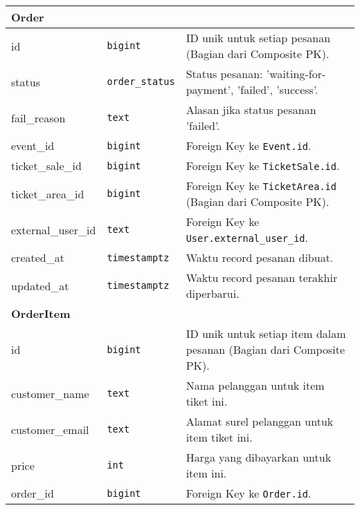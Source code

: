 \begin{longtable}{|l|p{}|p{}|}
	\hline
	\multicolumn{3}{|l|}{\textbf{Order}}                                                                                  \\
	\hline
	id                   & \texttt{bigint}          & ID unik untuk setiap pesanan (Bagian dari Composite PK).            \\
	\hline
	status               & \texttt{order\_status}   & Status pesanan: 'waiting-for-payment', 'failed', 'success'.         \\
	\hline
	fail\_reason         & \texttt{text}            & Alasan jika status pesanan 'failed'.                                \\
	\hline
	event\_id            & \texttt{bigint}          & Foreign Key ke \texttt{Event.id}.                                   \\
	\hline
	ticket\_sale\_id     & \texttt{bigint}          & Foreign Key ke \texttt{TicketSale.id}.                              \\
	\hline
	ticket\_area\_id     & \texttt{bigint}          & Foreign Key ke \texttt{TicketArea.id} (Bagian dari Composite PK).   \\
	\hline
	external\_user\_id   & \texttt{text}            & Foreign Key ke \texttt{User.external\_user\_id}.                    \\
	\hline
	created\_at          & \texttt{timestamptz}     & Waktu record pesanan dibuat.                                        \\
	\hline
	updated\_at          & \texttt{timestamptz}     & Waktu record pesanan terakhir diperbarui.                           \\
	\hline
	\multicolumn{3}{|l|}{\textbf{OrderItem}}                                                                              \\
	\hline
	id                   & \texttt{bigint}          & ID unik untuk setiap item dalam pesanan (Bagian dari Composite PK). \\
	\hline
	customer\_name       & \texttt{text}            & Nama pelanggan untuk item tiket ini.                                \\
	\hline
	customer\_email      & \texttt{text}            & Alamat surel pelanggan untuk item tiket ini.                        \\
	\hline
	price                & \texttt{int}             & Harga yang dibayarkan untuk item ini.                               \\
	\hline
	order\_id            & \texttt{bigint}          & Foreign Key ke \texttt{Order.id}.                                   \\

\end{longtable}
